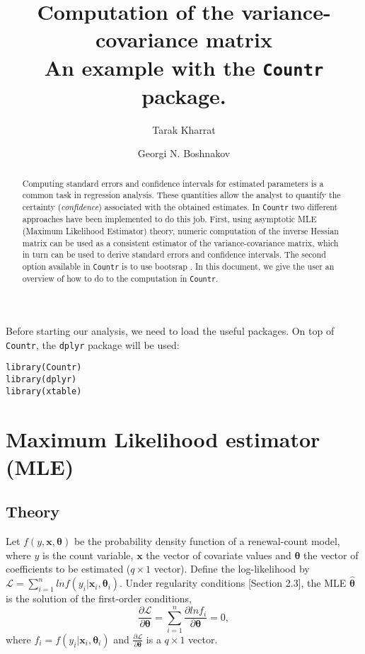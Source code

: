 \documentclass[a4paper,twoside,11pt]{article}
\author[1]{Tarak Kharrat}
\author[2]{Georgi N. Boshnakov}
\affil[1]{Salford Business School, University of Salford, UK.}
\affil[2]{School of Mathematics, University of Manchester, UK.}
\date{}
\title{Computation of the variance-covariance matrix\\\medskip
\large An example with the \texttt{Countr} package.}
\begin{document}
\maketitle
\begin{abstract}
Computing standard errors and confidence intervals for estimated parameters is a
common task in regression analysis. These quantities allow the analyst to
quantify the certainty (\emph{confidence}) associated with the obtained estimates. In
\texttt{Countr} two different approaches have been implemented to do this job. First, using
asymptotic MLE (Maximum Likelihood Estimator) theory, numeric computation of the
inverse Hessian matrix can be used as a consistent estimator of the
variance-covariance matrix, which in turn can be used to derive standard errors
and confidence intervals. The second option available in \texttt{Countr} is to use
bootsrap \citep{efron1979bootstrap}. In this document, we give the user an
overview of how to do to the computation in \texttt{Countr}.
\end{abstract}

Before starting our analysis, we need to load the useful packages. On top of
\texttt{Countr}, the \texttt{dplyr} package \citep{dplyr2016} will be used:
\begin{verbatim}
library(Countr)
library(dplyr)
library(xtable)
\end{verbatim}


\section{Maximum Likelihood estimator (MLE)}
\label{sec:org00b2160}

\subsection{Theory}
\label{sec:org3f9bf68}

Let \(f(y, \mathbf{x}, \bm{\theta})\) be the probability density function of a
renewal-count model, where \(y\) is the count variable, \(\mathbf{x}\) the vector of
covariate values and \(\bm{\theta}\) the vector of coefficients to be
estimated (\(q \times 1\) vector). Define the log-likelihood by \(\mathcal{L} =
\sum_{i=1}^{n} ln f(y_i|\mathbf{x}_i, \bm{\theta}_i)\). Under regularity
conditions  \citep[see for example]{cameron2013regression}[Section 2.3], the MLE
\(\bm{\hat{\theta}}\) is the solution of the first-order conditions,
\begin{equation}      
     \frac{\partial \mathcal{L}}{\partial \bm{\theta}} 
     = \sum_{i=1}^{n} \frac{\partial ln f_i}{\partial \bm{\theta}} = 0 
     ,
\end{equation}        
where \(f_i = f(y_i|\mathbf{x}_i, \bm{\theta}_i)\) and \(\frac{\partial
\mathcal{L}}{\partial \bm{\theta}}\) is a \(q \times 1\) vector.
\end{document}
